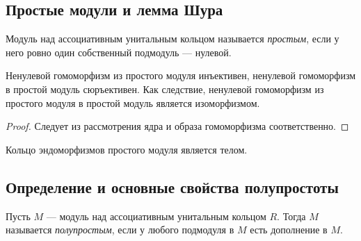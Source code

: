 \documentclass[
	extrafontsizes,
	11pt,
	hyphens,
]{memoir}
\begin{document}
\subsection{Простые модули и лемма Шура}

\begin{definition}
Модуль над ассоциативным унитальным кольцом называется \emph{простым}, если у него ровно один собственный подмодуль --- нулевой.
\end{definition}

\begin{lemma}
Ненулевой гомоморфизм из простого модуля инъективен, ненулевой гомоморфизм в простой модуль сюръективен. Как следствие, ненулевой гомоморфизм из простого модуля в простой модуль является изоморфизмом.
\end{lemma}

\begin{proof}
Следует из рассмотрения ядра и образа гомоморфизма соответственно.
\end{proof}

\begin{corollary}
Кольцо эндоморфизмов простого модуля является телом.
\end{corollary}

\subsection{Определение и основные свойства полупростоты}

\begin{definition}
Пусть \(M\) --- модуль над ассоциативным унитальным кольцом \(R\). Тогда \(M\) называется \emph{полупростым}, если у любого подмодуля в \(M\) есть дополнение в \(M\).
\end{definition}

%
\end{document}
